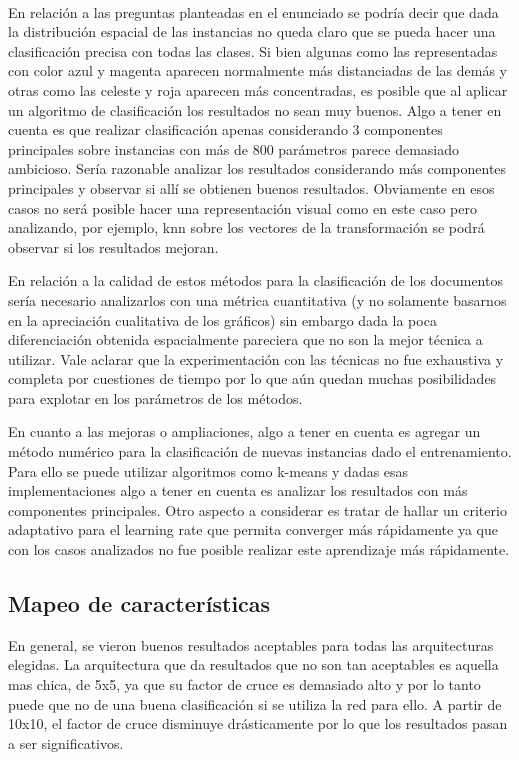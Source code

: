 \documentclass[informe.tex]{subfiles}
\begin{document}
      ~
      
      En relación a las preguntas planteadas en el enunciado se podría decir que dada la distribución espacial de las instancias no queda claro que se pueda hacer una clasificación precisa con todas las clases. Si bien algunas como las representadas con color azul y magenta aparecen normalmente más distanciadas de las demás y otras como las celeste y roja aparecen más concentradas, es posible que al aplicar un algoritmo de clasificación los resultados no sean muy buenos. Algo a tener en cuenta es que realizar clasificación apenas considerando 3 componentes principales sobre instancias con más de 800 parámetros parece demasiado ambicioso. Sería razonable analizar los resultados considerando más componentes principales y observar si all\'i se obtienen buenos resultados. Obviamente en esos casos no ser\'a posible hacer una representaci\'on visual como en este caso pero analizando, por ejemplo, knn sobre los vectores de la transformación se podr\'a observar si los resultados mejoran.
      
      En relación a la calidad de estos métodos para la clasificación de los documentos sería necesario analizarlos con una métrica cuantitativa (y no solamente basarnos en la apreciación cualitativa de los gráficos) sin embargo dada la poca diferenciación obtenida espacialmente pareciera que no son la mejor técnica a utilizar. Vale aclarar que la experimentación con las técnicas no fue exhaustiva y completa por cuestiones de tiempo por lo que aún quedan muchas posibilidades para explotar en los parámetros de los métodos.
      
      En cuanto a las mejoras o ampliaciones, algo a tener en cuenta es agregar un m\'etodo num\'erico para la clasificaci\'on de nuevas instancias dado el entrenamiento. Para ello se puede utilizar algoritmos como k-means y dadas esas implementaciones algo a tener en cuenta es analizar los resultados con más componentes principales. Otro aspecto a considerar es tratar de hallar un criterio adaptativo para el learning rate que permita converger más rápidamente ya que con los casos analizados no fue posible realizar este aprendizaje más rápidamente.
      
      
      
    \subsection{Mapeo de características}
    
    En general, se vieron buenos resultados aceptables para todas las arquitecturas elegidas. La arquitectura que da resultados que no son tan aceptables es aquella mas chica, de 5x5, ya que su factor de cruce es demasiado alto y por lo tanto puede que no de una buena clasificaci\'on si se utiliza la red para ello. A partir de 10x10, el factor de cruce disminuye dr\'asticamente por lo que los resultados pasan a ser significativos.
    
\end{document}
